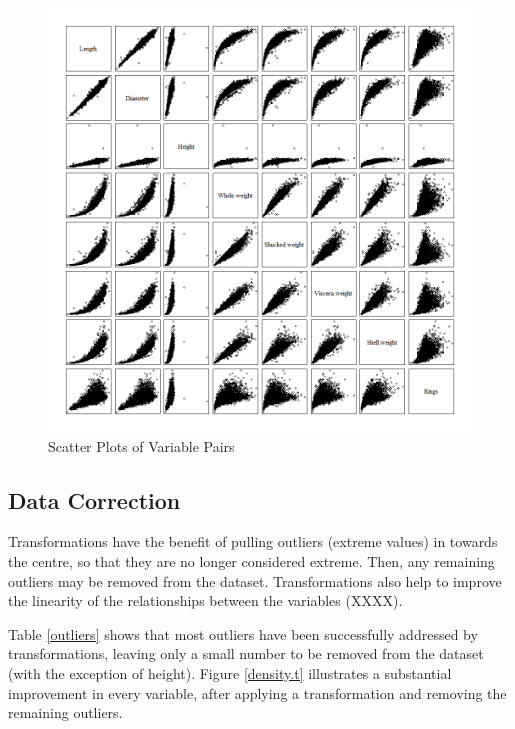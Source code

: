 \documentclass[11pt, a4paper]{article}
\begin{document}
    \begin{figure}[hbt!]
        \centering
        \includegraphics[width=\textwidth]{1.3.png}
        \caption{Scatter Plots of Variable Pairs}
        \label{pairs}
    \end{figure}

    \subsection{Data Correction}

    Transformations have the benefit of pulling outliers (extreme values) in towards the centre, so that they are no longer considered extreme. Then, any remaining outliers may be removed from the dataset. Transformations also help to improve the linearity of the relationships between the variables (XXXX).

    Table \ref{outliers} shows that most outliers have been successfully addressed by transformations, leaving only a small number to be removed from the dataset (with the exception of height). Figure \ref{density.t} illustrates a substantial improvement in every variable, after applying a transformation and removing the remaining outliers. 
    
\end{document}
